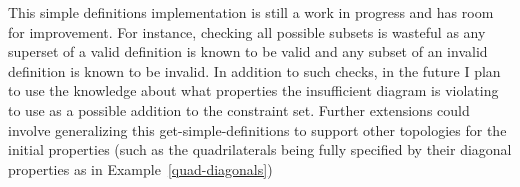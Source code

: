 This simple definitions implementation is still a work in progress and
has room for improvement. For instance, checking all possible subsets
is wasteful as any superset of a valid definition is known to be valid
and any subset of an invalid definition is known to be invalid. In
addition to such checks, in the future I plan to use the knowledge
about what properties the insufficient diagram is violating to use as
a possible addition to the constraint set. Further extensions could
involve generalizing this get-simple-definitions to support other
topologies for the initial properties (such as the quadrilaterals
being fully specified by their diagonal properties as in
Example~\ref{quad-diagonals})
